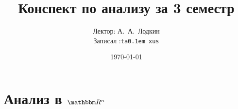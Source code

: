 \documentclass[12pt]{../notes}
\title{Конспект по анализу за 3 семестр}
\date{\today}
\author{Лектор: А.~А.~Лодкин \\
Записал :\texttt{ta\lower 0.1em \hbox{x}us}}
\begin{document}
\maketitle
\tableofcontents
\clearpage

\chapter{Анализ в \texorpdfstring{$\R^n$}{}}

\end{document}
